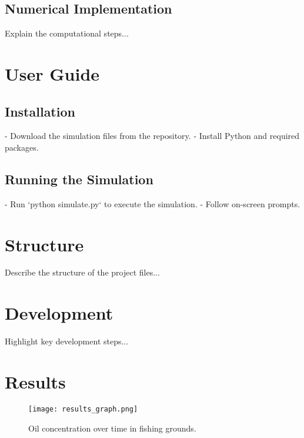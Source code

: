 \documentclass{article}
\begin{document}
\subsection{Numerical Implementation}
Explain the computational steps...

\section{User Guide}
\subsection{Installation}
- Download the simulation files from the repository.
- Install Python and required packages.
\subsection{Running the Simulation}
- Run `python simulate.py` to execute the simulation.
- Follow on-screen prompts.

\section{Structure}
Describe the structure of the project files...

\section{Development}
Highlight key development steps...

\section{Results}
\begin{figure}[h!]
\centering
\texttt{[image: results\_graph.png]}
\caption{Oil concentration over time in fishing grounds.}
\label{fig:results}
\end{figure}
\end{document}
